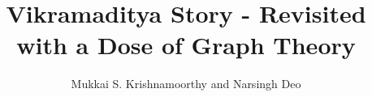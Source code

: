 \documentclass[book,12pt,oneside,openany]{memoir}
\title{Vikramaditya Story - Revisited with a Dose of Graph Theory}
\author{Mukkai S. Krishnamoorthy and Narsingh Deo}
\date{}
\begin{document}
\maketitle
\begin{newpage}

\tableofcontents
\end{newpage}



























\end{document}
